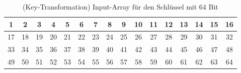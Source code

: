 \begin{table}[H]
    \centering
        \begin{tabular}{|*{16}{c|}}
            \hline
            \cellcolor{red-1}1 & \cellcolor{red-1}2 & \cellcolor{red-1}3 & \cellcolor{red-1}4 & 
            \cellcolor{red-1}5 & \cellcolor{red-1}6 & \cellcolor{red-1}7 & \cellcolor{red-1}8 & 
            \cellcolor{yellow-1}9 & \cellcolor{yellow-1}10 & \cellcolor{yellow-1}11 & \cellcolor{yellow-1}12 & 
            \cellcolor{yellow-1}13 & \cellcolor{yellow-1}14 & \cellcolor{yellow-1}15 & \cellcolor{yellow-1}16 \\
            \hline
            \cellcolor{green-1}17 & \cellcolor{green-1}18 & \cellcolor{green-1}19 & \cellcolor{green-1}20 & 
            \cellcolor{green-1}21 & \cellcolor{green-1}22 & \cellcolor{green-1}23 & \cellcolor{green-1}24 & 
            \cellcolor{blue-1}25 & \cellcolor{blue-1}26 & \cellcolor{blue-1}27 & \cellcolor{blue-1}28 & 
            \cellcolor{blue-1}29 & \cellcolor{blue-1}30 & \cellcolor{blue-1}31 & \cellcolor{blue-1}32 \\
            \hline
            \cellcolor{orange-1}33 & \cellcolor{orange-1}34 & \cellcolor{orange-1}35 & \cellcolor{orange-1}36 & 
            \cellcolor{orange-1}37 & \cellcolor{orange-1}38 & \cellcolor{orange-1}39 & \cellcolor{orange-1}40 & 
            \cellcolor{purple-1}41 & \cellcolor{purple-1}42 & \cellcolor{purple-1}43 & \cellcolor{purple-1}44 & 
            \cellcolor{purple-1}45 & \cellcolor{purple-1}46 & \cellcolor{purple-1}47 & \cellcolor{purple-1}48 \\
            \hline
            \cellcolor{cyan-1}49 & \cellcolor{cyan-1}50 & \cellcolor{cyan-1}51 & \cellcolor{cyan-1}52 & 
            \cellcolor{cyan-1}53 & \cellcolor{cyan-1}54 & \cellcolor{cyan-1}55 & \cellcolor{cyan-1}56 & 
            \cellcolor{magenta-1}57 & \cellcolor{magenta-1}58 & \cellcolor{magenta-1}59 & \cellcolor{magenta-1}60 & 
            \cellcolor{magenta-1}61 & \cellcolor{magenta-1}62 & \cellcolor{magenta-1}63 & \cellcolor{magenta-1}64 \\
            \hline
        \end{tabular}
    \caption{(Key-Transformation) Input-Array für den Schlüssel mit 64 Bit}
    \label{tab:key-tranformation-1}
\end{table}

